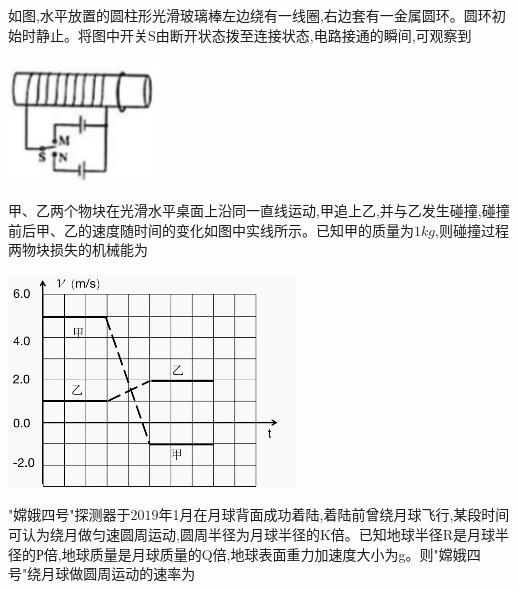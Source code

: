 \question[6]如图,水平放置的圆柱形光滑玻璃棒左边绕有一线圈,右边套有一金属圆环。圆环初始时静止。将图中开关S由断开状态拨至连接状态,电路接通的瞬间,可观察到\begin{center}\includegraphics[width=4cm]{img/image1.png}\end{center}
\begin{solution}{4cm}

\end{solution}



\question[6]甲、乙两个物块在光滑水平桌面上沿同一直线运动,甲追上乙,并与乙发生碰撞,碰撞前后甲、乙的速度随时间的变化如图中实线所示。已知甲的质量为$1kg$,则碰撞过程两物块损失的机械能为\begin{center}\includegraphics[]{img/image2.png}\end{center}
\begin{solution}{4cm}

\end{solution}



\question[6]"嫦娥四号"探测器于$2019$年1月在月球背面成功着陆,着陆前曾绕月球飞行,某段时间可认为绕月做匀速圆周运动,圆周半径为月球半径的K倍。已知地球半径R是月球半径的Р倍,地球质量是月球质量的Q倍,地球表面重力加速度大小为g。则"嫦娥四号"绕月球做圆周运动的速率为
\begin{solution}{4cm}

\end{solution}



